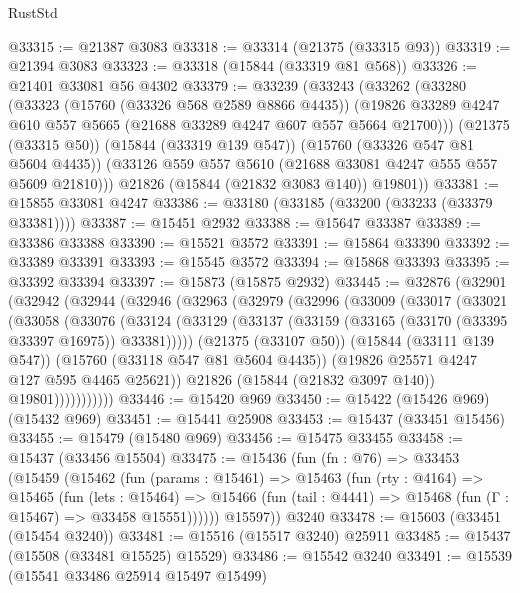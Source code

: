 \begin{lexlean}{RustStd}
\begin{coremodule}
@33315 := @21387 @3083
@33318 := @33314 (@21375 (@33315 @93))
@33319 := @21394 @3083
@33323 := @33318 (@15844 (@33319 @81 @568))
@33326 := @21401 @33081 @56 @4302
@33379 := @33239
    (@33243
      (@33262
        (@33280
          (@33323
            (@15760 (@33326 @568 @2589 @8866 @4435))
            (@19826 @33289 @4247 @610 @557 @5665 (@21688 @33289 @4247 @607 @557 @5664 @21700)))
          (@21375 (@33315 @50))
          (@15844 (@33319 @139 @547))
          (@15760 (@33326 @547 @81 @5604 @4435))
          (@33126 @559 @557 @5610 (@21688 @33081 @4247 @555 @557 @5609 @21810)))
        @21826
        (@15844 (@21832 @3083 @140))
        @19801))
@33381 := @15855 @33081 @4247
@33386 := @33180 (@33185 (@33200 (@33233 (@33379 @33381))))
@33387 := @15451 @2932
@33388 := @15647 @33387
@33389 := @33386 @33388
@33390 := @15521 @3572
@33391 := @15864 @33390
@33392 := @33389 @33391
@33393 := @15545 @3572
@33394 := @15868 @33393
@33395 := @33392 @33394
@33397 := @15873 (@15875 @2932)
@33445 := @32876
    (@32901
      (@32942
        (@32944
          (@32946
            (@32963
              (@32979
                (@32996
                  (@33009
                    (@33017
                      (@33021
                        (@33058
                          (@33076
                            (@33124
                              (@33129
                                (@33137 (@33159 (@33165 (@33170 (@33395 @33397 @16975)) @33381)))))
                            (@21375 (@33107 @50))
                            (@15844 (@33111 @139 @547))
                            (@15760 (@33118 @547 @81 @5604 @4435))
                            (@19826 @25571 @4247 @127 @595 @4465 @25621))
                          @21826
                          (@15844 (@21832 @3097 @140))
                          @19801)))))))))))
@33446 := @15420 @969
@33450 := @15422 (@15426 @969) (@15432 @969)
@33451 := @15441 @25908
@33453 := @15437 (@33451 @15456)
@33455 := @15479 (@15480 @969)
@33456 := @15475 @33455
@33458 := @15437 (@33456 @15504)
@33475 := @15436
    (fun (fn : @76) =>
    @33453
      (@15459
        (@15462
          (fun (params : @15461) =>
          @15463
            (fun (rty : @4164) =>
            @15465
              (fun (lets : @15464) =>
              @15466 (fun (tail : @4441) => @15468 (fun (Γ : @15467) => @33458 @15551))))))
        @15597))
    @3240
@33478 := @15603 (@33451 (@15454 @3240))
@33481 := @15516 (@15517 @3240) @25911
@33485 := @15437 (@15508 (@33481 @15525) @15529)
@33486 := @15542 @3240
@33491 := @15539 (@15541 @33486 @25914 @15497 @15499)

\end{coremodule}
\end{lexlean}
